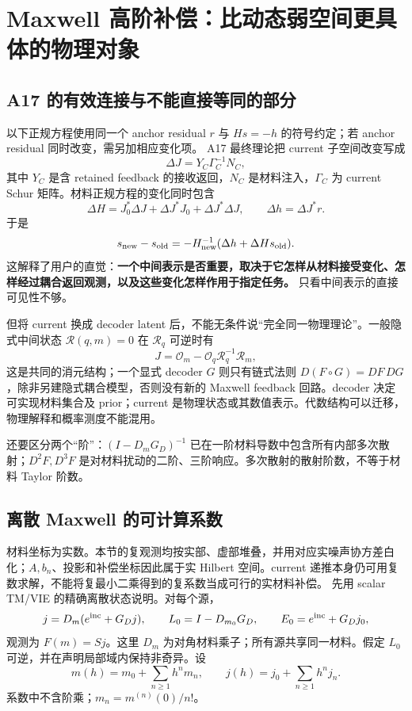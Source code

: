 \section{Maxwell 高阶补偿：比动态弱空间更具体的物理对象}
\label{sec:jets}

\subsection{A17 的有效连接与不能直接等同的部分}
以下正规方程使用同一个 anchor residual $r$ 与 $Hs=-h$ 的符号约定；若 anchor residual 同时改变，需另加相应变化项。
A17 最终理论把 current 子空间改变写成
\[
\Delta J=Y_C\Gamma_C^{-1}N_C,
\]
其中 $Y_C$ 是含 retained feedback 的接收返回，$N_C$ 是材料注入，$\Gamma_C$ 为 current Schur 矩阵。材料正规方程的变化同时包含
\[
\Delta H=J_0^*\Delta J+\Delta J^*J_0+\Delta J^*\Delta J,
\qquad
\Delta h=\Delta J^*r.
\]
于是
\[
s_{\rm new}-s_{\rm old}
=-H_{\rm new}^{-1}(\Delta h+\Delta Hs_{\rm old}).
\]
这解释了用户的直觉：\textbf{一个中间表示是否重要，取决于它怎样从材料接受变化、怎样经过耦合返回观测，以及这些变化怎样作用于指定任务。} 只看中间表示的直接可见性不够。

但将 current 换成 decoder latent 后，不能无条件说“完全同一物理理论”。一般隐式中间状态 $\mathcal R(q,m)=0$ 在 $\mathcal R_q$ 可逆时有
\[
J=\mathcal O_m-\mathcal O_q\mathcal R_q^{-1}\mathcal R_m,
\]
这是共同的消元结构；一个显式 decoder $G$ 则只有链式法则 $D(F\circ G)=DF\,DG$，除非另建隐式耦合模型，否则没有新的 Maxwell feedback 回路。decoder 决定可实现材料集合及 prior；current 是物理状态或其数值表示。代数结构可以迁移，物理解释和概率测度不能混用。

还要区分两个“阶”：$(I-D_mG_D)^{-1}$ 已在一阶材料导数中包含所有内部多次散射；$D^2F,D^3F$ 是对材料扰动的二阶、三阶响应。多次散射的散射阶数，不等于材料 Taylor 阶数。

\subsection{离散 Maxwell 的可计算系数}
材料坐标为实数。本节的复观测均按实部、虚部堆叠，并用对应实噪声协方差白化；$A,b_n$、投影和补偿坐标因此属于实 Hilbert 空间。current 递推本身仍可用复数求解，不能将复最小二乘得到的复系数当成可行的实材料补偿。
先用 scalar TM/VIE 的精确离散状态说明。对每个源，
\[
j=D_m(e^{\rm inc}+G_Dj),\qquad
L_0=I-D_{m_0}G_D,\qquad E_0=e^{\rm inc}+G_Dj_0,
\]
观测为 $F(m)=Sj$。这里 $D_m$ 为对角材料乘子；所有源共享同一材料。假定 $L_0$ 可逆，并在声明局部域内保持非奇异。设
\[
m(h)=m_0+\sum_{n\ge1}h^nm_n,\qquad
j(h)=j_0+\sum_{n\ge1}h^nj_n .
\]
系数中不含阶乘；$m_n=m^{(n)}(0)/n!$。

